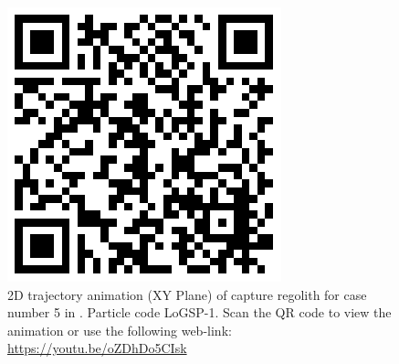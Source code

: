 \begin{figure}[htb]
\centering
\captionsetup{justification=centering}
\includegraphics[scale=0.2]{longest_edge_perturbations/3.2Density_1cmSize/qrcode_10ms_45Azimuth_315SolarPhase.png}
\caption{2D trajectory animation (XY Plane) of capture regolith for case number 5 in . Particle code LoGSP-1. Scan the QR code to view the animation or use the following web-link: \url{https://youtu.be/oZDhDo5CIsk}}
\label{fig:LoGSP_1_capture_case_5_2d_trajectory_animation}
\end{figure}
\FloatBarrier

